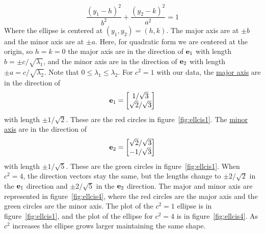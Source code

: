         \[
            \frac{{\left(y_1-h\right)}^2}{b^2} + \frac{{\left(y_2-k\right)}^2}{a^2} = 1
        \]
        Where the ellipse is centered at $\left(y_1, y_2\right) = \left(h, k\right)$. The major axis are at $\pm b$ and the minor axis are at $\pm a$. Here, for quadratic form we are centered at the origin, so $h = k = 0$ the major axis are in the direction of $\bold{e}_1$ with length $b = \pm c/\sqrt{\lambda_1}$, and the minor axis are in the direction of $\bold{e}_2$ with length $\pm a = c/\sqrt{\lambda_2}$. Note that $0 \le \lambda_1 \leq \lambda_2$.
        \newline
        \newline
        For $c^2 = 1$ with our data, the \underline{major axis} are in the direction of 
        \[
            \bold{e}_1 
            = 
            \begin{bmatrix}
                1/\sqrt{3} \\
                \sqrt{2}/\sqrt{3}
            \end{bmatrix}
        \] 
        with length $\pm 1/\sqrt{2}$. These are the red circles in figure~\ref{fig:ellcis1}.
        \newline
        The \underline{minor axis} are in the direction of 
        \[
            \bold{e}_2 
            = 
            \begin{bmatrix}
                \sqrt{2}/\sqrt{3} \\
                -1/\sqrt{3}
            \end{bmatrix}
        \] 
        with length $\pm 1/\sqrt{5}$. These are the green circles in figure~\ref{fig:ellcis1}.
        When $c^2 = 4$, the direction vectors stay the same, but the lengths change to $\pm 2/\sqrt{2}$ in the $\bold{e}_1$ direction and $\pm 2/\sqrt{5}$ in the $\bold{e}_2$ direction. The major and minor axis are represented in figure~\ref{fig:ellcis4}, where the red circles are the major axis and the green circles are the minor axis. The plot of the $c^2 = 1$ ellipse is in figure~\ref{fig:ellcis1}, and the plot of the ellipse for $c^2 = 4$ is in figure~\ref{fig:ellcis4}. As $c^2$ increases the ellipse grows larger maintaining the same shape.

